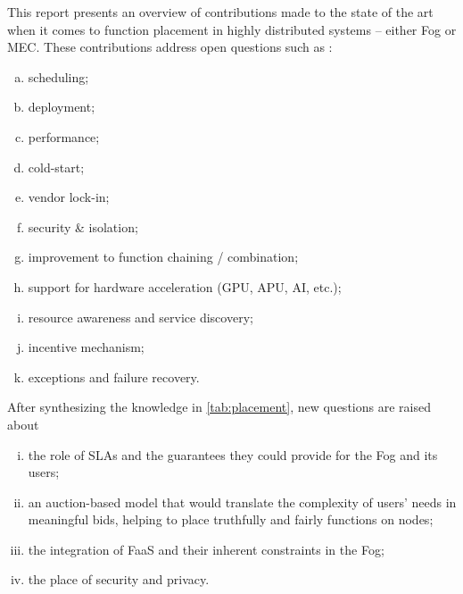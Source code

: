 \documentclass[11pt]{sdm}
\begin{document}
This report presents an overview of contributions made to the state of the art when it comes to function placement in highly distributed systems -- either Fog or \gls{MEC}. These contributions address open questions such as \cite{kjorveziroski_iot_2021,xie_when_2021}:
\begin{enumerate}[(a)]
	\item scheduling;
	\item deployment;
	\item performance;
	\item cold-start;
	\item vendor lock-in;
	\item security \& isolation;
	\item improvement to function chaining / combination;
	\item support for hardware acceleration (\gls{GPU}, \gls{APU}, \gls{AI}, etc.);
	\item resource awareness and service discovery;
	\item incentive mechanism;
	\item exceptions and failure recovery.
\end{enumerate}
After synthesizing the knowledge in \cref{tab:placement}, new questions are raised about
\begin{enumerate}[(i)]
	\item the role of \glspl{SLA} and the guarantees they could provide for the Fog and its users;
	\item an auction-based model that would translate the complexity of users' needs in meaningful bids, helping to place truthfully and fairly functions on nodes;
	\item the integration of \gls{FaaS} and their inherent constraints in the Fog;
	\item the place of security and privacy.
\end{enumerate}

\printbibliography
\end{document}
